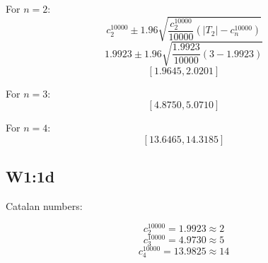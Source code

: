 \documentclass{article}
\begin{document}
For \(n=2\):
\[c_2^{10000} \pm 1.96\sqrt{\frac{c_2^{10000}}{10000}(|T_2|-c_n^{10000})}\]
\[1.9923 \pm 1.96\sqrt{\frac{1.9923}{10000}(3-1.9923)}\]
\[[1.9645,2.0201]\]

For \(n=3\):
\[[4.8750,5.0710]\]

For \(n=4\):
\[[13.6465,14.3185]\]

\subsection{W1:1d}

Catalan numbers:

\[c_2^{10000} = 1.9923 \approx 2\]
\[c_3^{10000} = 4.9730 \approx 5\]
\[c_4^{10000} = 13.9825 \approx 14\]
\end{document}
